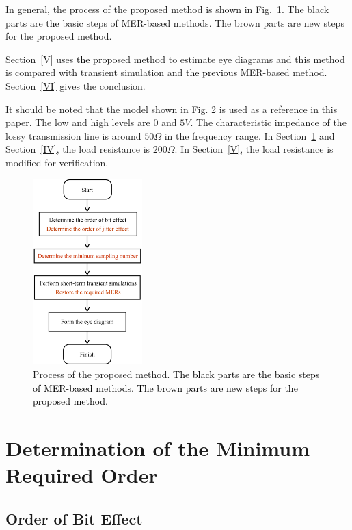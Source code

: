 \documentclass[conference]{IEEEtran}
\begin{document}
In general, the process of the proposed method is shown in Fig.~\ref{Fig4}. The black parts are \textcolor{black}{the} basic steps of MER-based methods. The brown parts are new steps for the proposed method.

Section~\ref{V} uses \textcolor{black}{the} proposed method to estimate eye diagrams and this method is compared with transient simulation and \textcolor{black}{the previous} MER-based method. Section~\ref{VI} gives the conclusion.

\color{black}
It should be noted that the model shown in Fig. 2 is used as a reference in this paper.
\color{black}
The low and high levels are $0$ and $5V$. The characteristic impedance of the lossy transmission line is around $50\Omega$ in the frequency range.
\color{black}
In Section~\ref{III} and Section~\ref{IV}, the load resistance is $200\Omega$. In Section~\ref{V}, the load resistance is modified for verification.
\color{black}

\begin{figure}[t]
\centerline{\includegraphics[width=120pt]{Fig4.png}}
\caption{Process of the proposed method. \textcolor{black}{The black parts are the basic steps of MER-based methods. The brown parts are new steps for the proposed method.}}
\label{Fig4}
\end{figure}

\section{Determination of the Minimum Required Order}\label{III}

\subsection{Order of Bit Effect}\label{IIIA}
\end{document}
